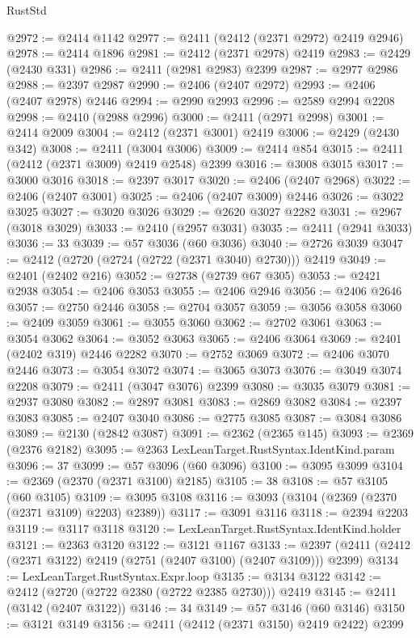 \begin{lexlean}{RustStd}
\begin{coremodule}
@2972 := @2414 @1142
@2977 := @2411 (@2412 (@2371 @2972) @2419 @2946)
@2978 := @2414 @1896
@2981 := @2412 (@2371 @2978) @2419
@2983 := @2429 (@2430 @331)
@2986 := @2411 (@2981 @2983) @2399
@2987 := @2977 @2986
@2988 := @2397 @2987
@2990 := @2406 (@2407 @2972)
@2993 := @2406 (@2407 @2978) @2446
@2994 := @2990 @2993
@2996 := @2589 @2994 @2208
@2998 := @2410 (@2988 @2996)
@3000 := @2411 (@2971 @2998)
@3001 := @2414 @2009
@3004 := @2412 (@2371 @3001) @2419
@3006 := @2429 (@2430 @342)
@3008 := @2411 (@3004 @3006)
@3009 := @2414 @854
@3015 := @2411 (@2412 (@2371 @3009) @2419 @2548) @2399
@3016 := @3008 @3015
@3017 := @3000 @3016
@3018 := @2397 @3017
@3020 := @2406 (@2407 @2968)
@3022 := @2406 (@2407 @3001)
@3025 := @2406 (@2407 @3009) @2446
@3026 := @3022 @3025
@3027 := @3020 @3026
@3029 := @2620 @3027 @2282
@3031 := @2967 (@3018 @3029)
@3033 := @2410 (@2957 @3031)
@3035 := @2411 (@2941 @3033)
@3036 := 33
@3039 := @57 @3036 (@60 @3036)
@3040 := @2726 @3039
@3047 := @2412 (@2720 (@2724 (@2722 (@2371 @3040) @2730))) @2419
@3049 := @2401 (@2402 @216)
@3052 := @2738 (@2739 @67 @305)
@3053 := @2421 @2938
@3054 := @2406 @3053
@3055 := @2406 @2946
@3056 := @2406 @2646
@3057 := @2750 @2446
@3058 := @2704 @3057
@3059 := @3056 @3058
@3060 := @2409 @3059
@3061 := @3055 @3060
@3062 := @2702 @3061
@3063 := @3054 @3062
@3064 := @3052 @3063
@3065 := @2406 @3064
@3069 := @2401 (@2402 @319) @2446 @2282
@3070 := @2752 @3069
@3072 := @2406 @3070 @2446
@3073 := @3054 @3072
@3074 := @3065 @3073
@3076 := @3049 @3074 @2208
@3079 := @2411 (@3047 @3076) @2399
@3080 := @3035 @3079
@3081 := @2937 @3080
@3082 := @2897 @3081
@3083 := @2869 @3082
@3084 := @2397 @3083
@3085 := @2407 @3040
@3086 := @2775 @3085
@3087 := @3084 @3086
@3089 := @2130 (@2842 @3087)
@3091 := @2362 (@2365 @145)
@3093 := @2369 (@2376 @2182)
@3095 := @2363 LexLeanTarget.RustSyntax.IdentKind.param
@3096 := 37
@3099 := @57 @3096 (@60 @3096)
@3100 := @3095 @3099
@3104 := @2369 (@2370 (@2371 @3100) @2185)
@3105 := 38
@3108 := @57 @3105 (@60 @3105)
@3109 := @3095 @3108
@3116 := @3093 (@3104 (@2369 (@2370 (@2371 @3109) @2203) @2389))
@3117 := @3091 @3116
@3118 := @2394 @2203
@3119 := @3117 @3118
@3120 := LexLeanTarget.RustSyntax.IdentKind.holder
@3121 := @2363 @3120
@3122 := @3121 @1167
@3133 := @2397 (@2411 (@2412 (@2371 @3122) @2419 (@2751 (@2407 @3100) (@2407 @3109))) @2399)
@3134 := LexLeanTarget.RustSyntax.Expr.loop
@3135 := @3134 @3122
@3142 := @2412 (@2720 (@2722 @2380 (@2722 @2385 @2730))) @2419
@3145 := @2411 (@3142 (@2407 @3122))
@3146 := 34
@3149 := @57 @3146 (@60 @3146)
@3150 := @3121 @3149
@3156 := @2411 (@2412 (@2371 @3150) @2419 @2422) @2399

\end{coremodule}
\end{lexlean}
